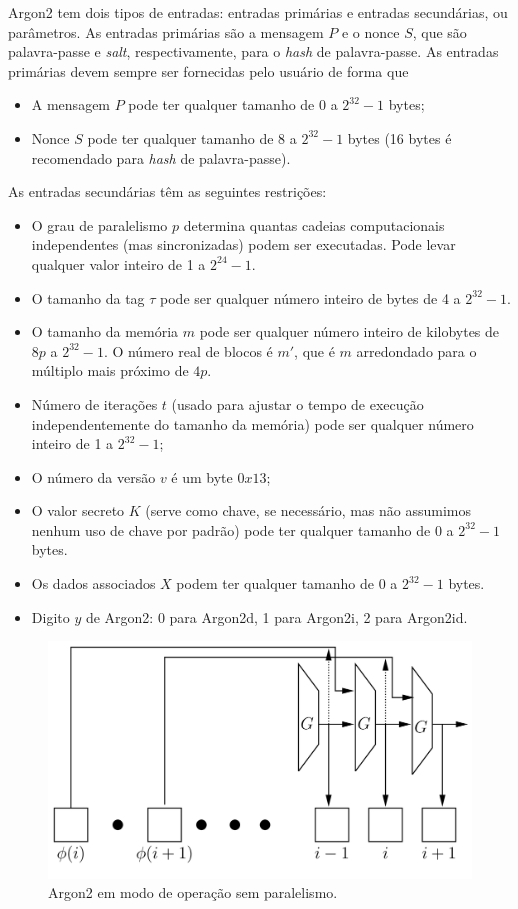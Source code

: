 \documentclass[conference]{IEEEtran}
\begin{document}
Argon2 tem dois tipos de entradas: entradas primárias e entradas secundárias, ou parâmetros. 
As entradas primárias são a mensagem $P$ e o nonce $S$, que são palavra-passe e \textit{salt}, respectivamente, para o 
\textit{hash} de palavra-passe. As entradas primárias devem sempre ser fornecidas pelo usuário de forma que
\begin{itemize}
\item A mensagem $P$ pode ter qualquer tamanho de $0$ a $2^{32}-1$ bytes;
\item Nonce $S$ pode ter qualquer tamanho de $8$ a $2^{32}-1$ bytes (16 bytes é recomendado para \textit{hash} de palavra-passe).
\end{itemize}
As entradas secundárias têm as seguintes restrições:
\begin{itemize}
\item O grau de paralelismo $p$ determina quantas cadeias computacionais independentes (mas sincronizadas) 
podem ser executadas. Pode levar qualquer valor inteiro de 1 a $2^{24}-1$.
\item O tamanho da tag $\tau$ pode ser qualquer número inteiro de bytes de 4 a $2^{32}-1$.
\item O tamanho da memória $m$ pode ser qualquer número inteiro de kilobytes de $8p$ a $2^{32}-1$. O número 
real de blocos é $m'$, que é $m$ arredondado para o múltiplo mais próximo de $4p$.
\item Número de iterações $t$ (usado para ajustar o tempo de execução independentemente do tamanho da memória) 
pode ser qualquer número inteiro de 1 a $2^{32}-1$;
\item O número da versão $v$ é um byte $0x13$;
\item O valor secreto $K$ (serve como chave, se necessário, mas não assumimos nenhum uso de chave por padrão) 
pode ter qualquer tamanho de $0$ a $2^{32}-1$ bytes.
\item Os dados associados $X$ podem ter qualquer tamanho de $0$ a $2^{32}-1$ bytes.
\item Digito $y$ de Argon2: 0 para Argon2d, 1 para Argon2i, 2 para Argon2id.
\end{itemize}

\begin{figure}[ht]
\centering
\includegraphics[scale=0.1]{assets/argon2-no-parallelism.png}
\caption{Argon2 em modo de operação sem paralelismo. }\label{fig:generic}
\end{figure}
\end{document}
